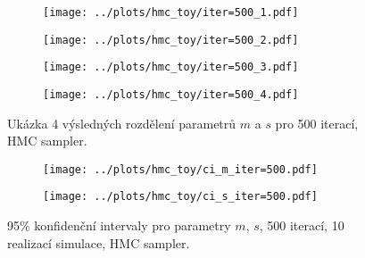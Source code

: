 \documentclass[11pt,oneside,american,czech]{article}
\begin{document}
\begin{figure}
	\centering
	\begin{subfigure}{0.45\textwidth}
		\centering
		\texttt{[image: ../plots/hmc\_toy/iter=500\_1.pdf]}
	\end{subfigure}
	\hspace{0.5cm}
	\begin{subfigure}{0.45\textwidth}
		\centering
		\texttt{[image: ../plots/hmc\_toy/iter=500\_2.pdf]}
	\end{subfigure}
	
	\vspace{2cm}
	
	\begin{subfigure}{0.45\textwidth}
		\centering
		\texttt{[image: ../plots/hmc\_toy/iter=500\_3.pdf]}
	\end{subfigure}
	\hspace{0.5cm}
	\begin{subfigure}{0.45\textwidth}
		\centering
		\texttt{[image: ../plots/hmc\_toy/iter=500\_4.pdf]}
	\end{subfigure}
	\caption{Ukázka 4 výsledných rozdělení parametrů $m$ a $s$ pro 500 iterací, HMC sampler.}
	\label{Obr: hmc toy 500}
\end{figure}

\begin{figure}
	\centering
	\begin{subfigure}{0.46\textwidth}
		\centering
		\texttt{[image: ../plots/hmc\_toy/ci\_m\_iter=500.pdf]}
	\end{subfigure}
	\hspace{0.5cm}
	\begin{subfigure}{0.46\textwidth}
		\centering
		\texttt{[image: ../plots/hmc\_toy/ci\_s\_iter=500.pdf]}
	\end{subfigure}
	\caption{95\% konfidenční intervaly pro parametry $m$, $s$, 500 iterací, 10 realizací simulace, HMC sampler.}
	\label{hmc toy 500 CI}
\end{figure}
\end{document}
